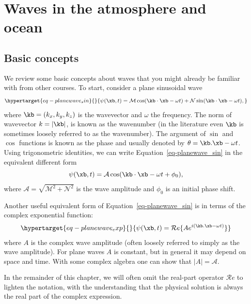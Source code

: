 \documentclass[
  letterpaper,
  twocolumn,
  landscape]{report}
\begin{document}
\hypertarget{chap-waves}{%
\chapter{Waves in the atmosphere and ocean}\label{chap-waves}}

\hypertarget{basic-concepts}{%
\section{Basic concepts}\label{basic-concepts}}

We review some basic concepts about waves that you might already be
familiar with from other courses. To start, consider a plane sinusoidal
wave\\
\begin{equation}\protect\hypertarget{eq-planewave_sin}{}{
    \psi(\xb,t) = \mathcal{M} \cos(\kb \cdot \xb - \omega t) + \mathcal{N} \sin(\kb \cdot \xb - \omega t),
}\label{eq-planewave_sin}\end{equation} where \(\kb = (k_x,k_y,k_z)\) is
the wavevector and \(\omega\) the frequency. The norm of wavevector
\(k = |\kb|\), is known as the wavenumber (in the literature even
\(\kb\) is sometimes loosely referred to as the wavenumber). The
argument of \(\sin\) and \(\cos\) functions is known as the phase and
usually denoted by \(\theta = \kb . \xb - \omega t\). Using
trigonometric identities, we can write Equation~\ref{eq-planewave_sin}
in the equivalent different form \[
    \psi(\xb,t) = \mathcal{A} \cos(\kb \cdot \xb - \omega t + \phi_0),
\] where \(\mathcal{A} = \sqrt{\mathcal{M}^2+\mathcal{N}^2}\) is the
wave amplitude and \(\phi_0\) is an initial phase shift.

Another useful equivalent form of Equation~\ref{eq-planewave_sin} is in
terms of the complex exponential function:
\begin{equation}\protect\hypertarget{eq-planewave_exp}{}{
    \psi(\xb,t) = \mathcal{R}e \{ A e^{i (\kb . \xb - \omega t)} \}
}\label{eq-planewave_exp}\end{equation} where \(A\) is the complex wave
amplitude (often loosely referred to simply as the wave amplitude). For
plane waves \(A\) is constant, but in general it may depend on space and
time. With some complex algebra one can show that \(|A| = \mathcal{A}\).

In the remainder of this chapter, we will often omit the real-part
operator \(\mathcal{R}e\) to lighten the notation, with the
understanding that the physical solution is always the real part of the
complex expression.
\end{document}
